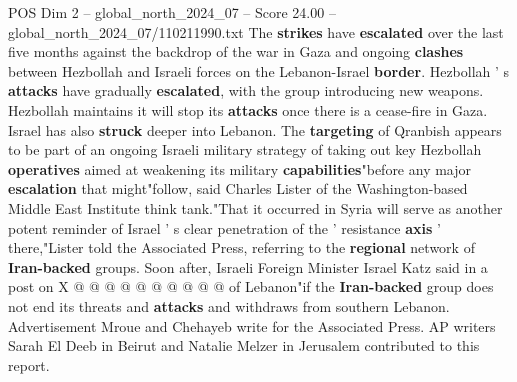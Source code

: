 \begin{textsample}{POS Dim 2 – global\_north\_2024\_07 – Score 24.00 – global\_north\_2024\_07/110211990.txt}
The \textbf{strikes} have \textbf{escalated} over the last five months against the backdrop of the war in Gaza and ongoing \textbf{clashes} between Hezbollah and Israeli forces on the Lebanon-Israel \textbf{border}.
Hezbollah ' s \textbf{attacks} have gradually \textbf{escalated}, with the group introducing new weapons.
Hezbollah maintains it will stop its \textbf{attacks} once there is a cease-fire in Gaza.
Israel has also \textbf{struck} deeper into Lebanon.
The \textbf{targeting} of Qranbish appears to be part of an ongoing Israeli military strategy of taking out key Hezbollah \textbf{operatives} aimed at weakening its military \textbf{capabilities}"before any major \textbf{escalation} that might"follow, said Charles Lister of the Washington-based Middle East Institute think tank."That it occurred in Syria will serve as another potent reminder of Israel ' s clear penetration of the ' resistance \textbf{axis} ' there,"Lister told the Associated Press, referring to the \textbf{regional} network of \textbf{Iran-backed} groups.
Soon after, Israeli Foreign Minister Israel Katz said in a post on X @ @ @ @ @ @ @ @ @ @ of Lebanon"if the \textbf{Iran-backed} group does not end its threats and \textbf{attacks} and withdraws from southern Lebanon.
Advertisement Mroue and Chehayeb write for the Associated Press.
AP writers Sarah El Deeb in Beirut and Natalie Melzer in Jerusalem contributed to this report.

\end{textsample}

